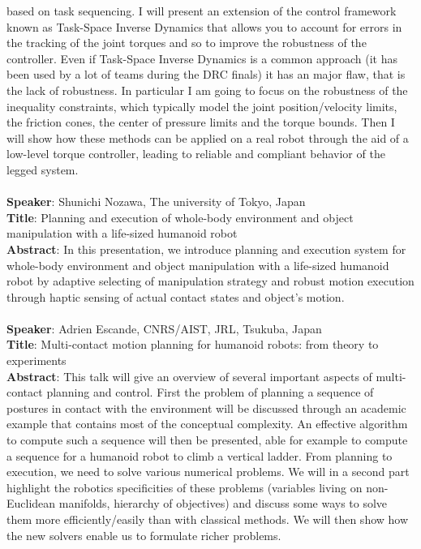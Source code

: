 \documentclass[conference]{IEEEtran}
\begin{document}
based on task sequencing. I will present an extension of the
control framework known as Task-Space Inverse Dynamics
that allows you to account for errors in the tracking of
the joint torques and so to improve the robustness of the
controller. Even if Task-Space Inverse Dynamics is a common
approach (it has been used by a lot of teams during the DRC
finals) it has an major flaw, that is the lack of robustness.
In particular I am going to focus on the robustness of
the inequality constraints, which typically model the joint
position/velocity limits, the friction cones, the center of
pressure limits and the torque bounds. Then I will show how
these methods can be applied on a real robot through the
aid of a low-level torque controller, leading to reliable and
compliant behavior of the legged system.  \\ \\
\textbf{Speaker}: Shunichi Nozawa, The university of Tokyo, Japan \\
\textbf{Title}:  Planning and execution of whole-body environment and object
manipulation with a life-sized humanoid robot \\
\textbf{Abstract}: In this presentation, we introduce planning and execution system for whole-body environment and object manipulation with a life-sized humanoid robot by adaptive selecting of manipulation strategy and robust motion execution through haptic sensing of actual contact states and object's motion. \\ \\
\textbf{Speaker}: Adrien Escande, CNRS/AIST, JRL, Tsukuba, Japan \\
\textbf{Title}: Multi-contact motion planning for humanoid robots: from theory to experiments \\ 
\textbf{Abstract}: This talk will give an overview of several important aspects of multi-contact planning and control. First the problem of planning a sequence of postures in contact with the environment will be discussed through an academic example that contains most of the conceptual complexity. An effective algorithm to compute such a sequence will then be presented, able for example to compute a sequence for a humanoid robot to climb a vertical ladder. From planning to execution, we need to solve various numerical problems. We will in a second part highlight the robotics specificities of these problems (variables living on non-Euclidean manifolds, hierarchy of objectives) and discuss some ways to solve them more efficiently/easily than with classical methods. We will then show how the new solvers enable us to formulate richer problems. \\ \\
\end{document}
